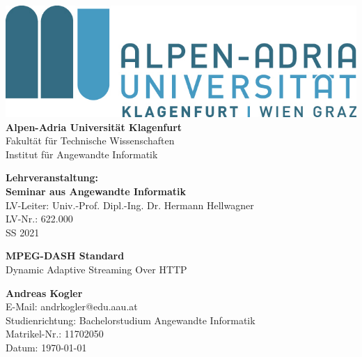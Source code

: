 \documentclass[paper = a4, fontsize = 12pt, parskip = half]{scrartcl} %
\begin{document}

\begin{titlepage}

    \begin{center}
        \includegraphics{images/logo.jpg} \\
        \vspace{8mm}
        \huge\textbf{Alpen-Adria Universität Klagenfurt} \\
        \vspace{3mm}
        Fakultät für Technische Wissenschaften \\
        \vspace{3mm}
        Institut für Angewandte Informatik \\
        \vspace{3mm}
    \end{center}
    
    \vspace{5mm}
    
    \begin{center}
        \textbf{Lehrveranstaltung: \\
            Seminar aus Angewandte Informatik} \\
        \vspace{2mm}
        LV-Leiter: Univ.-Prof. Dipl.-Ing. Dr. Hermann Hellwagner \\
        LV-Nr.: 622.000 \\
        SS 2021
    \end{center}
    
    \vspace{15mm}
    
    \begin{center}
        \Large\textbf{MPEG-DASH Standard} \\
        \vspace{2mm}
        \normalsize Dynamic Adaptive Streaming Over HTTP
    \end{center}
    
    \vspace{40mm}
    
    \begin{flushleft}
        \textbf{Andreas Kogler} \\
        E-Mail: andrkogler@edu.aau.at \\
        Studienrichtung: Bachelorstudium Angewandte Informatik \\
        Matrikel-Nr.: 11702050\\
        Datum: \today
    \end{flushleft}
    
\end{titlepage}
\end{document}
